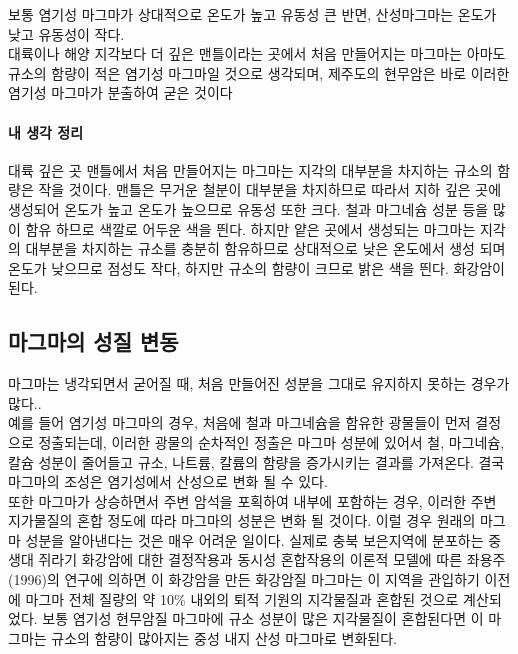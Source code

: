 \documentclass[12pt, a4paper, twoside]{book}
\begin{document}
				보통 염기성 마그마가 상대적으로 온도가 높고 유동성 큰 반면, 산성마그마는 온도가 낮고 유동성이 작다. \\
				
				대륙이나 해양 지각보다 더 깊은 맨틀이라는 곳에서 처음 만들어지는 마그마는 아마도 규소의 함량이 적은 염기성 마그마일 것으로 생각되며, 제주도의 현무암은 바로 이러한 염기성 마그마가 분출하여 굳은 것이다
				



				\paragraph{내 생각 정리}
				
				대륙 깊은 곳 맨틀에서 처음 만들어지는 마그마는 지각의 대부분을 차지하는 규소의 함량은 작을 것이다. 
				맨틀은 무거운 철분이 대부분을 차지하므로 따라서 지하 깊은 곳에 생성되어 온도가 높고 온도가 높으므로 유동성 또한 크다. 
				철과 마그네슘 성분 등을 많이 함유 하므로 색깔로 어두운 색을 띈다. 
				하지만 얕은 곳에서 생성되는 마그마는 지각의 대부분을 차지하는 규소를 충분히 함유하므로 상대적으로 낮은 온도에서 생성 되며 온도가 낮으므로 점성도 작다, 하지만 규소의 함량이 크므로 밝은 색을 띈다. 화강암이 된다.
				

	\subsection{마그마의 성질 변동}

				마그마는 냉각되면서 굳어질 때, 처음 만들어진 성분을 그대로 유지하지 못하는 경우가 많다..  \\
				
				예를 들어 염기성 마그마의 경우, 처음에 철과 마그네슘을 함유한 광물들이 먼저 결정으로 정출되는데, 이러한 광물의 순차적인 정출은 마그마 성분에 있어서 철, 마그네슘, 칼슘 성분이 줄어들고 규소, 나트륨, 칼륨의 함량을 증가시키는 결과를 가져온다. 
				결국 마그마의 조성은 염기성에서 산성으로 변화 될 수 있다. \\
				
				또한 마그마가 상승하면서 주변 암석을 포획하여 내부에 포함하는 경우, 이러한 주변 지가물질의 혼합 정도에 따라 마그마의 성분은 변화 될 것이다. 
				이럴 경우 원래의 마그마 성분을 알아낸다는 것은 매우 어려운 일이다. 
				실제로 충북 보은지역에 분포하는 중생대 쥐라기 화강암에 대한 결정작용과 동시성 혼합작용의 이론적 모델에 따른 좌용주(1996)의 연구에 의하면 
				이 화강암을 만든 화강암질 마그마는 이 지역을 관입하기 이전에 마그마 전체 질량의 약 10\% 내외의 퇴적 기원의 지각물질과 혼합된 것으로 계산되었다. 
				보통 염기성 현무암질 마그마에 규소 성분이 많은 지각물질이 혼합된다면 이 마그마는 규소의 함량이 많아지는 중성 내지 산성 마그마로 변화된다.  \\
				
\end{document}
